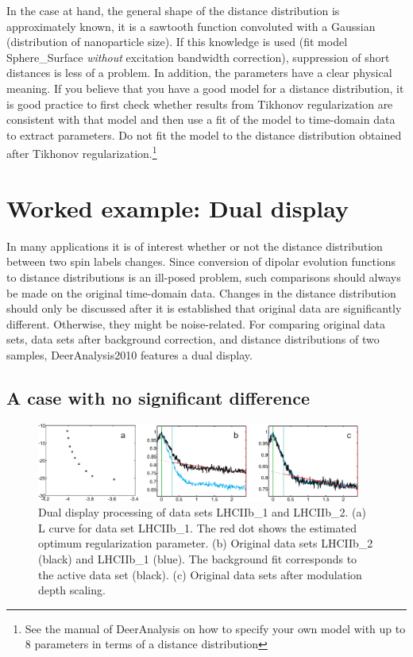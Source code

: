 \documentclass[11pt,a4paper]{article}
\begin{document}
In the case at hand, the general shape of the distance distribution is approximately known, it is a sawtooth function convoluted with a Gaussian (distribution of nanoparticle size). If this knowledge is used (fit model {\ttfamily Sphere\_Surface} \emph{without} excitation bandwidth correction), suppression of short distances is less of a problem. In addition, the parameters have a clear physical meaning. If you believe that you have a good model for a distance distribution, it is good practice to first check whether results from Tikhonov regularization are consistent with that model and then use a fit of the model to time-domain data to extract parameters. Do not fit the model to the distance distribution obtained after Tikhonov regularization.\footnote{See the manual of {\ttfamily DeerAnalysis} on how to specify your own model with up to 8 parameters in terms of a distance distribution}

\section{Worked example: Dual display}

In many applications it is of interest whether or not the distance distribution between two spin labels changes. Since conversion of dipolar evolution functions to distance distributions is an ill-posed problem, such comparisons should always be made on the original time-domain data. Changes in the distance distribution should only be discussed after it is established that original data are significantly different. Otherwise, they might be noise-related. For comparing original data sets, data sets after background correction, and distance distributions of two samples, DeerAnalysis2010 features a dual display.

\subsection{A case with no significant difference}

\begin{figure}[ht]
 \vspace{10mm}
 	\begin{center}
		\includegraphics[width=0.95\textwidth]{figure10.pdf}
	\end{center}
	\caption{Dual display processing of data sets {\ttfamily LHCIIb\_1} and {\ttfamily LHCIIb\_2}. (a) L curve for data set {\ttfamily LHCIIb\_1}. The red dot shows the estimated optimum regularization parameter. (b) Original data sets {\ttfamily LHCIIb\_2} (black) and {\ttfamily LHCIIb\_1} (blue). The background fit corresponds to the active data set (black). (c) Original data sets after modulation depth scaling.}
	\label{fig:10}
\end{figure}
\end{document}
